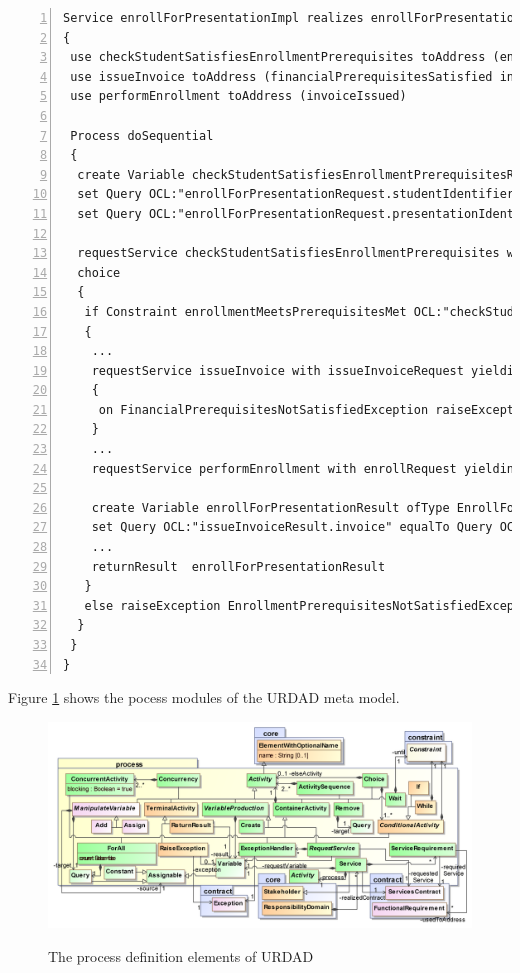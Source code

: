 \lstset{language=urdad,caption=Specifying a service in the textual URDAD DSL syntax.,label=serviceTextSyntax}
\begin{lstlisting}[numbers=left,escapechar=|]
Service enrollForPresentationImpl realizes enrollForPresentation receiving Variable enrollForPresentationRequest ofType EnrollForPresentationRequest
{
 use checkStudentSatisfiesEnrollmentPrerequisites toAddress (enrollmentPrerequisitesMet)
 use issueInvoice toAddress (financialPrerequisitesSatisfied invoiceIssued) 
 use performEnrollment toAddress (invoiceIssued)
   
 Process doSequential
 {
  create Variable checkStudentSatisfiesEnrollmentPrerequisitesRequest ofType CheckStudentSatisfiesEnrollmentPrerequisitesRequest               
  set Query OCL:"enrollForPresentationRequest.studentIdentifier" equalTo Query OCL:"checkEnrollmentPrerequisitesRequest.studentIdentifier"
  set Query OCL:"enrollForPresentationRequest.presentationIdentifier" equalTo Query OCL:"checkEnrollmentPrerequisitesRequest.presentationIdentifier"
                     
  requestService checkStudentSatisfiesEnrollmentPrerequisites with checkStudentSatisfiesEnrollmentPrerequisitesRequest yielding Variable checkStudentSatisfiesEnrollmentPrerequisitesResult ofType CheckStudentSatisfiesEnrollmentPrerequisitesResult
  choice
  {
   if Constraint enrollmentMeetsPrerequisitesMet OCL:"checkStudentSatisfiesEnrollmentPrerequisitesResult.enrollmentPrerequisitesMet = true" doSequential
   {
    ...
    requestService issueInvoice with issueInvoiceRequest yielding Variable issueInvoiceResult ofType IssueInvoiceResult
    {
     on FinancialPrerequisitesNotSatisfiedException raiseException FinancialPrerequisitesNotSatisfiedException
    }
    ...
    requestService performEnrollment with enrollRequest yielding Variable performEnrollmentResult ofType PerformEnrollmentResult
          
    create Variable enrollForPresentationResult ofType EnrollForPresentationResult
    set Query OCL:"issueInvoiceResult.invoice" equalTo Query OCL:"enrollForPresentationResult.invoice"
    ...                       
    returnResult  enrollForPresentationResult
   }
   else raiseException EnrollmentPrerequisitesNotSatisfiedException
  }
 }
}                 
\end{lstlisting}

Figure \ref{fig:processModule} shows the pocess modules of the URDAD meta model.
\begin{figure}[thbp]
  \centering
  \includegraphics{process}\\   
  \caption{The process definition elements of URDAD}
  \label{fig:processModule}
\end{figure}
 
